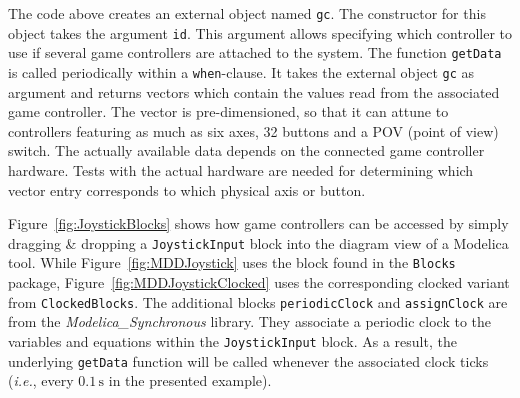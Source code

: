 \documentclass{resources/modelica}
\newcommand{\modelica}[1]{\lstinline[language=modelica]|#1|}
\begin{document}
\noindent
The code above creates an external object named \mbox{\modelica{gc}.}
The constructor for this object takes the argument \mbox{\modelica{id}.} This
argument allows specifying which controller to use if several game controllers
are attached to the system. The function \modelica{getData} is called
periodically within a \modelica{when}-clause. It \mbox{takes} the external object
\modelica{gc} as argument and returns vectors which contain the values read from
the associated game controller. The vector is pre-dimensioned, so that it can
attune to controllers featuring as much as six axes, 32 buttons and a POV (point
of view) switch. The actually available data depends on the connected game
controller hardware. Tests with the actual hardware are needed for determining
which vector entry corresponds to which physical axis or button.

Figure~\ref{fig:JoystickBlocks} shows how game controllers can be accessed by
simply dragging \& dropping a \modelica{JoystickInput} block into the diagram
view of a Modelica tool.
While Figure~\ref{fig:MDDJoystick} uses the block found
in the \modelica{Blocks} package,
Figure~\ref{fig:MDDJoystickClocked} uses the corresponding clocked variant from
\modelica{ClockedBlocks}. The additional blocks \modelica{periodicClock} and
\modelica{assignClock} are from the \emph{Modelica\_Synchronous} library. They
associate a periodic clock to the variables and equations within the
\modelica{JoystickInput} block. As a result, the underlying
\modelica{getData} function will be called whenever the
associated clock ticks (\textit{i.e.}, every $0.1\,\mathrm{s}$ in the presented
example).
\end{document}
